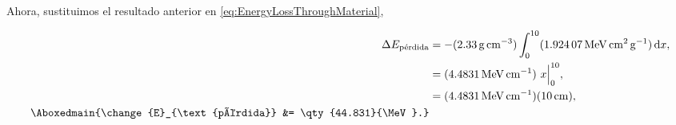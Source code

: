 \documentclass[./../main.tex]{subfiles}
\begin{document}
\begin{exercise}
\begin{solution}
            Ahora, sustituimos el resultado anterior en \cref{eq:EnergyLossThroughMaterial},

            \begin{align*}
                \change{E}_{\text{pérdida}} &= -(\qty{2.33}{\g\per\cm\cubed})\int_{0}^{10} (\qty{1.92407}{\MeV\cm\squared\per\g})\odif{x},\\
                &= (\qty{4.4831}{\MeV\per\cm})\ x\Big\rvert_{0}^{10},\\
                &= (\qty{4.4831}{\MeV\per\cm})(\qty{10}{\cm}),\\
                \Aboxedmain{\change{E}_{\text{pérdida}} &= \qty{44.831}{\MeV}.}
            \end{align*}
        \end{solution}
    \end{exercise}
\end{document}
